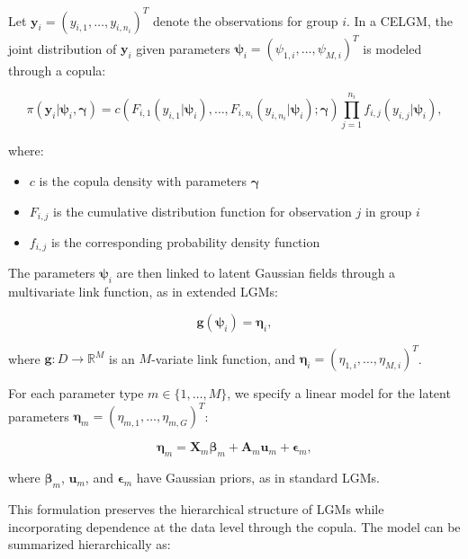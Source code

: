 Let $\mathbf{y}_i = (y_{i,1}, \ldots, y_{i,n_i})^T$ denote the observations for group $i$. In a CELGM, the joint distribution of $\mathbf{y}_i$ given parameters $\boldsymbol{\psi}_i = (\psi_{1,i}, \ldots, \psi_{M,i})^T$ is modeled through a copula:

\begin{equation}
    \pi(\mathbf{y}_i|\boldsymbol{\psi}_i, \boldsymbol{\gamma}) = c\left(F_{i,1}(y_{i,1}|\boldsymbol{\psi}_i), \ldots, F_{i,n_i}(y_{i,n_i}|\boldsymbol{\psi}_i); \boldsymbol{\gamma}\right) \prod_{j=1}^{n_i} f_{i,j}(y_{i,j}|\boldsymbol{\psi}_i),
\end{equation}

where:
\begin{itemize}
    \item $c$ is the copula density with parameters $\boldsymbol{\gamma}$
    \item $F_{i,j}$ is the cumulative distribution function for observation $j$ in group $i$
    \item $f_{i,j}$ is the corresponding probability density function
\end{itemize}

The parameters $\boldsymbol{\psi}_i$ are then linked to latent Gaussian fields through a multivariate link function, as in extended LGMs:

\begin{equation}
    \mathbf{g}(\boldsymbol{\psi}_i) = \boldsymbol{\eta}_i,
\end{equation}

where $\mathbf{g}: D \rightarrow \mathbb{R}^M$ is an $M$-variate link function, and $\boldsymbol{\eta}_i = (\eta_{1,i}, \ldots, \eta_{M,i})^T$.

For each parameter type $m \in \{1, \ldots, M\}$, we specify a linear model for the latent parameters $\boldsymbol{\eta}_m = (\eta_{m,1}, \ldots, \eta_{m,G})^T$:

\begin{equation}
    \boldsymbol{\eta}_m = \mathbf{X}_m \boldsymbol{\beta}_m + \mathbf{A}_m \mathbf{u}_m + \boldsymbol{\epsilon}_m,
\end{equation}

where $\boldsymbol{\beta}_m$, $\mathbf{u}_m$, and $\boldsymbol{\epsilon}_m$ have Gaussian priors, as in standard LGMs.

This formulation preserves the hierarchical structure of LGMs while incorporating dependence at the data level through the copula. The model can be summarized hierarchically as:

